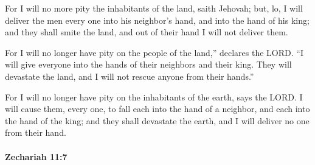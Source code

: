 			\begin{versebox}
					\item[BHS] 
					\item[LXX] 
					\item[ASV] For I will no more pity the inhabitants of the land, saith Jehovah; but, lo, I will deliver the men every one into his neighbor's hand, and into the hand of his king; and they shall smite the land, and out of their hand I will not deliver them.
					\item[NIV] For I will no longer have pity on the people of the land,” declares the LORD. “I will give everyone into the hands of their neighbors and their king. They will devastate the land, and I will not rescue anyone from their hands.”
					\item[NRSV] For I will no longer have pity on the inhabitants of the earth, says the LORD. I will cause them, every one, to fall each into the hand of a neighbor, and each into the hand of the king; and they shall devastate the earth, and I will deliver no one from their hand.
			\end{versebox}

		\paragraph{Zechariah 11:7} %
			\label{ZECHARIAH-11-7}

